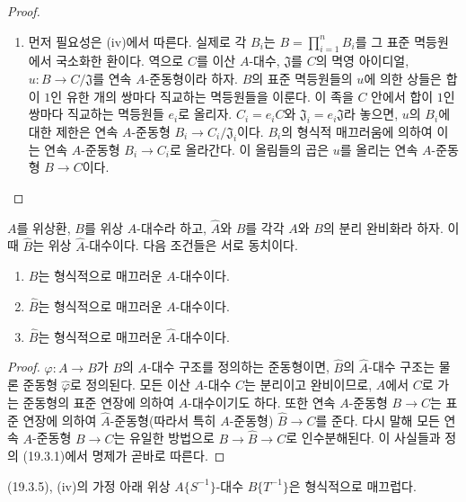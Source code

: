 \begin{proof}
\begin{enumerate}
  \item[(v)] 먼저 필요성은 (iv)에서 따른다. 실제로 각 $B_i$는
  $B=\prod_{i=1}^nB_i$를 그 표준 멱등원에서 국소화한 환이다. 역으로
  $C$를 이산 $A$-대수, $\mathfrak J$를 $C$의 멱영 아이디얼,
  $u:B\to C/\mathfrak J$를 연속 $A$-준동형이라 하자. $B$의 표준
  멱등원들의 $u$에 의한 상들은 합이 $1$인 유한 개의 쌍마다 직교하는
  멱등원들을 이룬다. 이 족을 $C$ 안에서 합이 $1$인 쌍마다 직교하는
  멱등원들 $e_i$로 올리자. $C_i=e_iC$와
  $\mathfrak J_i=e_i\mathfrak J$라 놓으면, $u$의 $B_i$에 대한 제한은
  연속 $A$-준동형 $B_i\to C_i/\mathfrak J_i$이다. $B_i$의 형식적
  매끄러움에 의하여 이는 연속 $A$-준동형 $B_i\to C_i$로 올라간다.
  이 올림들의 곱은 $u$를 올리는 연속 $A$-준동형 $B\to C$이다.
\end{enumerate}
\end{proof}


\begin{proposition}[19.3.6]
\label{0.19.3.6-fr}
$A$를 위상환, $B$를 위상 $A$-대수라 하고, $\widehat A$와
$\widehat B$를 각각 $A$와 $B$의 분리 완비화라 하자. 이때
$\widehat B$는 위상 $\widehat A$-대수이다. 다음 조건들은 서로
동치이다.
\begin{enumerate}
  \item[a)] $B$는 형식적으로 매끄러운 $A$-대수이다.
  \item[b)] $\widehat B$는 형식적으로 매끄러운 $A$-대수이다.
  \item[c)] $\widehat B$는 형식적으로 매끄러운 $\widehat A$-대수이다.
\end{enumerate}
\end{proposition}

\begin{proof}
$\varphi:A\to B$가 $B$의 $A$-대수 구조를 정의하는 준동형이면,
$\widehat B$의 $\widehat A$-대수 구조는 물론 준동형
$\widehat\varphi$로 정의된다. 모든 이산 $A$-대수 $C$는 분리이고
완비이므로, $A$에서 $C$로 가는 준동형의 표준 연장에 의하여
$\widehat A$-대수이기도 하다. 또한 연속 $A$-준동형 $B\to C$는 표준
연장에 의하여 $\widehat A$-준동형(따라서 특히 $A$-준동형)
$\widehat B\to C$를 준다. 다시 말해 모든 연속 $A$-준동형 $B\to C$는
유일한 방법으로 $B\to\widehat B\to C$로 인수분해된다. 이 사실들과
정의 (19.3.1)에서 명제가 곧바로 따른다.
\end{proof}

\begin{corollary}[19.3.7]
\label{0.19.3.7-fr}
(19.3.5), (iv)의 가정 아래 위상 $A\{S^{-1}\}$-대수
$B\{T^{-1}\}$은 형식적으로 매끄럽다.
\end{corollary}

